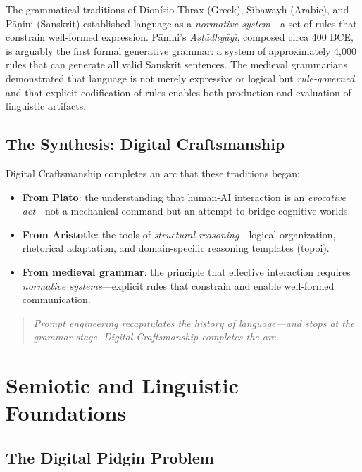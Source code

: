 \documentclass[12pt,a4paper]{article}
\begin{document}
The grammatical traditions of Dion\'isio Thrax (Greek), S\={\i}bawayh (Arabic), and P\={a}\d{n}ini (Sanskrit) established language as a \emph{normative system}---a set of rules that constrain well-formed expression. P\={a}\d{n}ini's \emph{A\d{s}\d{t}\={a}dhy\={a}y\={\i}}, composed circa 400 BCE, is arguably the first formal generative grammar: a system of approximately 4,000 rules that can generate all valid Sanskrit sentences. The medieval grammarians demonstrated that language is not merely expressive or logical but \emph{rule-governed}, and that explicit codification of rules enables both production and evaluation of linguistic artifacts.

\subsection{The Synthesis: Digital Craftsmanship}

Digital Craftsmanship completes an arc that these traditions began:

\begin{itemize}
  \item \textbf{From Plato}: the understanding that human-AI interaction is an \emph{evocative act}---not a mechanical command but an attempt to bridge cognitive worlds.
  \item \textbf{From Aristotle}: the tools of \emph{structural reasoning}---logical organization, rhetorical adaptation, and domain-specific reasoning templates (topoi).
  \item \textbf{From medieval grammar}: the principle that effective interaction requires \emph{normative systems}---explicit rules that constrain and enable well-formed communication.
\end{itemize}

\begin{quote}
\emph{Prompt engineering recapitulates the history of language---and stops at the grammar stage. Digital Craftsmanship completes the arc.}
\end{quote}


\section{Semiotic and Linguistic Foundations}
\label{sec:semiotics}

\subsection{The Digital Pidgin Problem}
\end{document}
